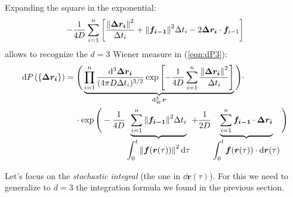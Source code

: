 \documentclass[../template.tex]{subfiles}
\begin{document}
\begin{comment}
(Note that, in the textbook, instead of $\bm{f}_{i-1}$ they are using the Stratonovich prescription $(\bm{f}_i + \bm{f}_{i-1})/2$, complicating the jacobian for a change of variables, while we are using Ito's. In the end, however, the final result will not depend on this choice - at least for this case).
\end{comment}

Expanding the square in the exponential:
\begin{align*}
    -\frac{1}{4D} \sum_{i=1}^n \left[\frac{\norm{\bm{\Delta r_i}}^2}{\Delta t_i} + \norm{\bm{f_{i-1}}}^2 \Delta t_i - 2 \bm{\Delta r_i} \cdot \bm{f}_{i-1} \right]
\end{align*}
allows to recognize the $d=3$ Wiener measure in (\ref{eqn:dP3}):
\begin{align} \nonumber
    \dd{P}(\{\bm{\Delta r_i}\}) &= \Bigg(\underbrace{\prod_{i=1}^n \frac{\dd[3]{\bm{\Delta r_i}}}{(4 \pi D \Delta t_i)^{3/2}} \exp\left[-\frac{1}{4D} \sum_{i=1}^n \frac{\norm{\bm{\Delta r_i}}^2}{\Delta t_i}  \right] }_{\dd[3]{_W \bm{r}}}\Bigg) \cdot\\
    &\quad \> \cdot \label{eqn:dP-int3}
    \exp\Bigg(-\frac{1}{4D} \underbrace{\sum_{i=1}^n \norm{\bm{f_{i-1}}}^2 \Delta t_i}_{\displaystyle\int_0^t \norm{\bm{f}(\bm{r}(\tau))}^2 \dd{\tau} }  + \frac{1}{2D} \underbrace{ \sum_{i=1}^n \bm{f_{i-1}} \cdot \bm{\Delta r_i}}_{\displaystyle \int_0^t \bm{f}(\bm{r}(\tau)) \cdot \dd{\bm{r}(\tau)}}  \Bigg)
\end{align}

Let's focus on the \textit{stochastic integral} (the one in $\dd{\bm{r}(\tau)}$). For this we need to generalize to $d=3$ the integration formula we found in the previous section.
\end{document}
